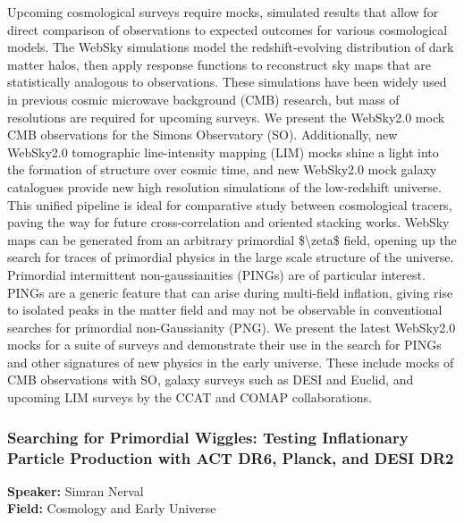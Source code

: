 Upcoming cosmological surveys require mocks, simulated results that allow for direct comparison of observations to expected outcomes for various cosmological models. The WebSky simulations model the redshift-evolving distribution of dark matter halos, then apply response functions to reconstruct sky maps that are statistically analogous to observations. These simulations have been widely used in previous cosmic microwave background (CMB) research, but mass of resolutions are required for upcoming surveys. We present the WebSky2.0 mock CMB observations for the Simons Observatory (SO). Additionally, new WebSky2.0 tomographic line-intensity mapping (LIM) mocks shine a light into the formation of structure over cosmic time, and new WebSky2.0 mock galaxy catalogues provide new high resolution simulations of the low-redshift universe. This unified pipeline is ideal for comparative study between cosmological tracers, paving the way for future cross-correlation and oriented stacking works. WebSky maps can be generated from an arbitrary primordial \$\textbackslash{}zeta\$ field, opening up the search for traces of primordial physics in the large scale structure of the universe. Primordial intermittent non-gaussianities (PINGs) are of particular interest. PINGs are a generic feature that can arise during multi-field inflation, giving rise to isolated peaks in the matter field and may not be observable in conventional searches for primordial non-Gaussianity (PNG). We present the latest WebSky2.0 mocks for a suite of surveys and demonstrate their use in the search for PINGs and other signatures of new physics in the early universe. These include mocks of CMB observations with SO, galaxy surveys such as DESI and Euclid, and upcoming LIM surveys by the CCAT and COMAP collaborations.

\hypertarget{abstract-talk-69}{}\label{abstract-page-talk-69}
\subsubsection*{Searching for Primordial Wiggles: Testing Inflationary Particle Production with ACT DR6, Planck, and DESI DR2}
\textbf{Speaker:} Simran Nerval\\
\textbf{Field:} Cosmology and Early Universe

